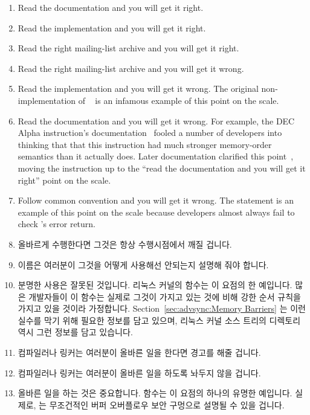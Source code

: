 \begin{enumerate}
\item	Read the documentation and you will get it right.
\item	Read the implementation and you will get it right.
\item	Read the right mailing-list archive and you will get it right.
\item	Read the right mailing-list archive and you will get it wrong.
\item	Read the implementation and you will get it wrong.
	The original non- implementation of
	~\cite{PaulEMcKenney2007PreemptibleRCU}
	is an infamous example of this point on the scale.
\item	Read the documentation and you will get it wrong.
	For example, the DEC Alpha  instruction's
	documentation~\cite{ALPHA95} fooled a
	number of developers into thinking that that this instruction
	had much stronger memory-order semantics than it actually does.
	Later documentation clarified this
	point~\cite{Compaq01,WilliamPugh2000Gharachorloo},
	moving the  instruction up to the
	``read the documentation and you will get it right'' point on
	the scale.
\item	Follow common convention and you will get it wrong.
	The  statement is an example of this point on the
	scale because
	developers almost always fail to check 's error return.
\fi
\item	올바르게 수행한다면 그것은 항상 수행시점에서 깨질 겁니다.
\item	이름은 여러분이 그것을 어떻게 사용해선 안되는지 설명해 줘야 합니다.
\item	분명한 사용은 잘못된 것입니다.
	리눅스 커널의  함수는 이 요점의 한 예입니다.
	많은 개발자들이 이 함수는 실제로 그것이 가지고 있는 것에 비해 강한 순서
	규칙을 가지고 있을 것이라 가정합니다.
	Section~\ref{sec:advsync:Memory Barriers} 는 이런 실수를 막기 위해
	필요한 정보를 담고 있으며, 리눅스 커널 소스 트리의 
	디렉토리 역시 그런 정보를 담고 있습니다.
\item	컴파일러나 링커는 여러분이 올바른 일을 한다면 경고를 해줄 겁니다.
\item	컴파일러나 링커는 여러분이 올바른 일을 하도록 놔두지 않을 겁니다.
\item	올바른 일을 하는 것은 중요합니다.
	 함수는 이 요점의 하나의 유명한 예입니다.
	실제로,  는 무조건적인 버퍼 오버플로우 보안 구멍으로 설명될
	수 있을 겁니다.
\iffalse


\end{enumerate}
